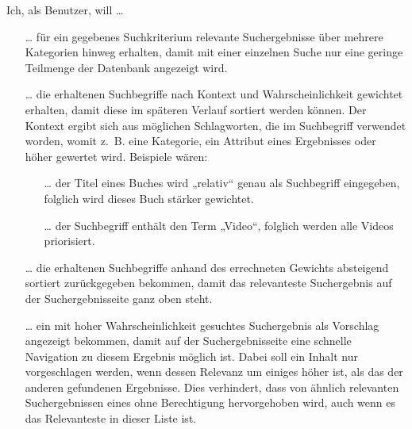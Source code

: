 \pagebreak
Ich, als Benutzer, will …
\begin{itemize}
  \item[…] für ein gegebenes Suchkriterium relevante Suchergebnisse über mehrere Kategorien hinweg erhalten, damit mit einer einzelnen Suche nur eine geringe Teilmenge der Datenbank angezeigt wird.
  \item[…] die erhaltenen Suchbegriffe nach Kontext und Wahrscheinlichkeit gewichtet erhalten, damit diese im späteren Verlauf sortiert werden können. Der Kontext ergibt sich aus möglichen Schlagworten, die im Suchbegriff verwendet worden, womit z. B. eine Kategorie, ein Attribut eines Ergebnisses oder höher gewertet wird. Beispiele wären:
    \begin{itemize}
      \item[…] der Titel eines Buches wird „relativ“ genau als Suchbegriff eingegeben, folglich wird dieses Buch stärker gewichtet.
      \item[…] der Suchbegriff enthält den Term „Video“, folglich werden alle Videos priorisiert.
    \end{itemize}
  \item[…] die erhaltenen Suchbegriffe anhand des errechneten Gewichts absteigend sortiert zurückgegeben bekommen, damit das relevanteste Suchergebnis auf der Suchergebnisseite ganz oben steht.
  \item[…] ein mit hoher Wahrscheinlichkeit gesuchtes Suchergebnis als Vorschlag angezeigt bekommen, damit auf der Suchergebnisseite eine schnelle Navigation zu diesem Ergebnis möglich ist.
    Dabei soll ein Inhalt nur vorgeschlagen werden, wenn dessen Relevanz um einiges höher ist, als das der anderen gefundenen Ergebnisse.
    Dies verhindert, dass von ähnlich relevanten Suchergebnissen eines ohne Berechtigung hervorgehoben wird, auch wenn es das Relevanteste in dieser Liste ist.
\end{itemize}
